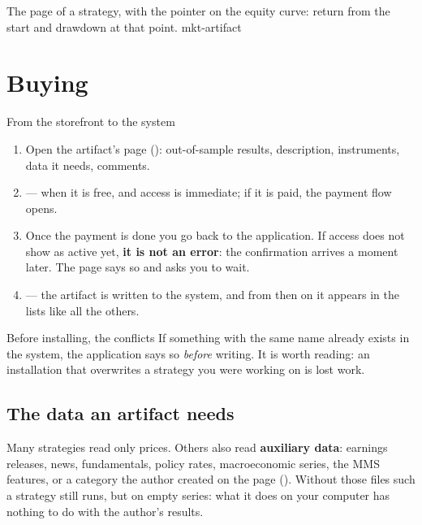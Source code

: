   {The page of a strategy, with the pointer on the equity curve: return from
   the start and drawdown at that point.}
  {mkt-artifact}

\section{Buying}\label{sez:buy}

\begin{pratica}{From the storefront to the system}
\begin{enumerate}
  \item Open the artifact's page (): out-of-sample
        results, description, instruments, data it needs, comments.
  \item {} ---  when it is free,
        and access is immediate; if it is paid, the payment flow opens.
  \item Once the payment is done you go back to the application. If access
        does not show as active yet, \textbf{it is not an error}: the
        confirmation arrives a moment later. The page says so and asks you to
        wait.
  \item {} --- the artifact is written to the system, and
        from then on it appears in the lists like all the others.
\end{enumerate}
\end{pratica}

\begin{nota}{Before installing, the conflicts}
If something with the same name already exists in the system, the
application says so \emph{before} writing. It is worth reading: an
installation that overwrites a strategy you were working on is lost work.
\end{nota}

\subsection{The data an artifact needs}\label{sez:aux-data}

Many strategies read only prices. Others also read \textbf{auxiliary data}:
earnings releases, news, fundamentals, policy rates, macroeconomic series,
the MMS features, or a category the author created on the  page
(). Without those files such a strategy still runs, but on
empty series: what it does on your computer has nothing to do with the
author's results.

